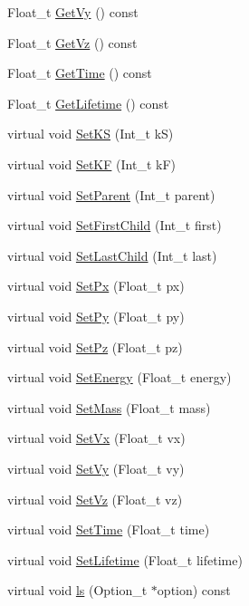 \begin{DoxyCompactItemize}
Float\+\_\+t \hyperlink{class_t_m_c_particle_af960ef928493566d6a23ff47609ee006}{Get\+Vy} () const 
\item 
Float\+\_\+t \hyperlink{class_t_m_c_particle_ab0bd465446ddf4180e7dae823a4327f6}{Get\+Vz} () const 
\item 
Float\+\_\+t \hyperlink{class_t_m_c_particle_a34cd640c9c556208d421f2cc127ca4c4}{Get\+Time} () const 
\item 
Float\+\_\+t \hyperlink{class_t_m_c_particle_aa5e6838e9f67cedbe656f68c67573857}{Get\+Lifetime} () const 
\item 
virtual void \hyperlink{class_t_m_c_particle_a7550d88cbacb6b0d19952d7ee388fba3}{Set\+K\+S} (Int\+\_\+t k\+S)
\item 
virtual void \hyperlink{class_t_m_c_particle_a843dac262f014ccbda1fce1c39660983}{Set\+K\+F} (Int\+\_\+t k\+F)
\item 
virtual void \hyperlink{class_t_m_c_particle_a1c80158fe0554f41d93a64294b3bb8e5}{Set\+Parent} (Int\+\_\+t parent)
\item 
virtual void \hyperlink{class_t_m_c_particle_a2b0533168e991682e39692a1986db4f8}{Set\+First\+Child} (Int\+\_\+t first)
\item 
virtual void \hyperlink{class_t_m_c_particle_ae88ebce74f9d6e02a7331f37a5068889}{Set\+Last\+Child} (Int\+\_\+t last)
\item 
virtual void \hyperlink{class_t_m_c_particle_a97e122290c515221562b4064773c0f0a}{Set\+Px} (Float\+\_\+t px)
\item 
virtual void \hyperlink{class_t_m_c_particle_a088b7e96c83c59f7af96150886b1e7b3}{Set\+Py} (Float\+\_\+t py)
\item 
virtual void \hyperlink{class_t_m_c_particle_a6550561cd264b5b3378dfb9aa6b99092}{Set\+Pz} (Float\+\_\+t pz)
\item 
virtual void \hyperlink{class_t_m_c_particle_a098ba449b812bebbf799702c038ac0bc}{Set\+Energy} (Float\+\_\+t energy)
\item 
virtual void \hyperlink{class_t_m_c_particle_a7963d66dbd4c5b9a94bd94a7df34d128}{Set\+Mass} (Float\+\_\+t mass)
\item 
virtual void \hyperlink{class_t_m_c_particle_ae7ab17aa702d572e599d3e86e2441e71}{Set\+Vx} (Float\+\_\+t vx)
\item 
virtual void \hyperlink{class_t_m_c_particle_a58b31bbc476b17ac6acb1d61a3993a1d}{Set\+Vy} (Float\+\_\+t vy)
\item 
virtual void \hyperlink{class_t_m_c_particle_ae0b85e576be88e2e4a70f49ce705cc0f}{Set\+Vz} (Float\+\_\+t vz)
\item 
virtual void \hyperlink{class_t_m_c_particle_a9e1bc39477b11d9734d49622e161df43}{Set\+Time} (Float\+\_\+t time)
\item 
virtual void \hyperlink{class_t_m_c_particle_aed3008b9d5281cf1299f984b1ed56d26}{Set\+Lifetime} (Float\+\_\+t lifetime)
\item 
virtual void \hyperlink{class_t_m_c_particle_a598fd9e615fa2bab5f66059fb59c2c11}{ls} (Option\+\_\+t $\ast$option) const 
\end{DoxyCompactItemize}

